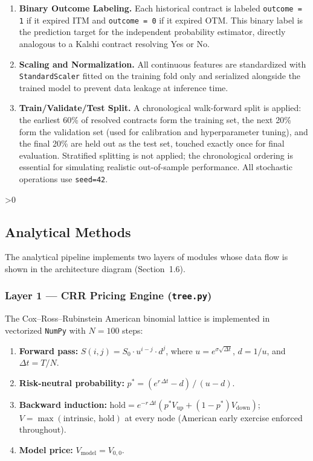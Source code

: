 \documentclass[12pt, letterpaper]{article}
\let\oldsubsection\subsection
\renewcommand{\subsection}{%
  \ifnum\value{subsection}>0 \clearpage\fi
  \oldsubsection
}
\begin{document}
\begin{enumerate}
  \item \textbf{Binary Outcome Labeling.}  Each historical contract
        is labeled \texttt{outcome = 1} if it expired ITM and
        \texttt{outcome = 0} if it expired OTM. This binary label
        is the prediction target for the independent probability
        estimator, directly analogous to a Kalshi contract resolving
        Yes or No.

  \item \textbf{Scaling and Normalization.}  All continuous features
        are standardized with \texttt{StandardScaler} fitted on the
        training fold only and serialized alongside the trained
        model to prevent data leakage at inference time.

  \item \textbf{Train/Validate/Test Split.}  A chronological
        walk-forward split is applied: the earliest 60\% of resolved
        contracts form the training set, the next 20\% form the
        validation set (used for calibration and hyperparameter
        tuning), and the final 20\% are held out as the test set,
        touched exactly once for final evaluation. Stratified
        splitting is not applied; the chronological ordering is
        essential for simulating realistic out-of-sample
        performance. All stochastic operations use
        \texttt{seed=42}.
\end{enumerate}

\subsection{Analytical Methods}

The analytical pipeline implements two layers of modules whose data
flow is shown in the architecture diagram (Section~1.6).

\subsubsection{Layer 1 --- CRR Pricing Engine (\texttt{tree.py})}

The Cox--Ross--Rubinstein American binomial lattice \citep{Cox1979}
is implemented in vectorized \texttt{NumPy} with $N = 100$ steps:

\begin{enumerate}
  \item \textbf{Forward pass:}
        $S(i,j) = S_0 \cdot u^{i-j} \cdot d^{j}$,
        where $u = e^{\sigma\sqrt{\Delta t}}$, $d = 1/u$, and
        $\Delta t = T/N$.
  \item \textbf{Risk-neutral probability:}
        $p^{*} = (e^{r\,\Delta t} - d)\,/\,(u - d)$.
  \item \textbf{Backward induction:}
        $\text{hold} = e^{-r\,\Delta t}(p^{*} V_{\text{up}} +
        (1-p^{*}) V_{\text{down}})$;
        $V = \max(\text{intrinsic},\,\text{hold})$ at every node
        (American early exercise enforced throughout).
  \item \textbf{Model price:} $V_{\text{model}} = V_{0,0}$.
\end{enumerate}
\end{document}
